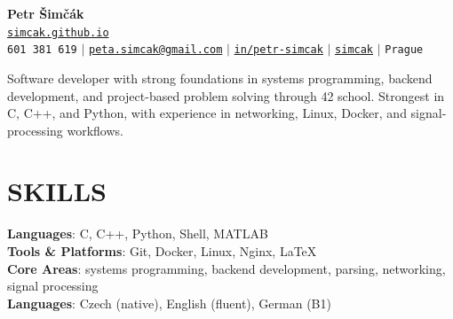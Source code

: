 \documentclass[letterpaper,11pt]{article}
\begin{document}
\begin{center}
    \textbf{\Huge Petr Šimčák} \\ \vspace{5pt}
    \href{https://simcak.github.io}{\small\texttt{simcak.github.io}} \\ \vspace{2pt}
    \small
    \faPhone* \hspace{2pt} \texttt{601 381 619} \hspace{6pt} $|$ \hspace{6pt}
    \faEnvelope \hspace{2pt} \href{mailto:peta.simcak@gmail.com}{\texttt{peta.simcak@gmail.com}} \hspace{6pt} $|$ \hspace{6pt}
    \faLinkedin \hspace{2pt} \href{https://www.linkedin.com/in/petr-simcak}{\texttt{in/petr-simcak}} \hspace{6pt} $|$ \hspace{6pt}
    \faGithub \hspace{2pt} \href{https://github.com/simcak}{\texttt{simcak}} \hspace{6pt} $|$ \hspace{6pt}
    \faMapMarker* \hspace{2pt} \texttt{Prague}
\end{center}

\vspace{4pt}
\small
Software developer with strong foundations in systems programming, backend development, and project-based problem solving through 42 school.
Strongest in C, C++, and Python, with experience in networking, Linux, Docker, and signal-processing workflows.

\section{SKILLS}
\begin{itemize}[leftmargin=0in, label={}]
  \small{\item{
    \textbf{Languages}{: C, C++, Python, Shell, MATLAB} \vspace{2pt} \\
    \textbf{Tools \& Platforms}{: Git, Docker, Linux, Nginx, LaTeX} \vspace{2pt} \\
    \textbf{Core Areas}{: systems programming, backend development, parsing, networking, signal processing} \\
    \textbf{Languages}{: Czech (native), English (fluent), German (B1)}
  }}
\end{itemize}
\end{document}
